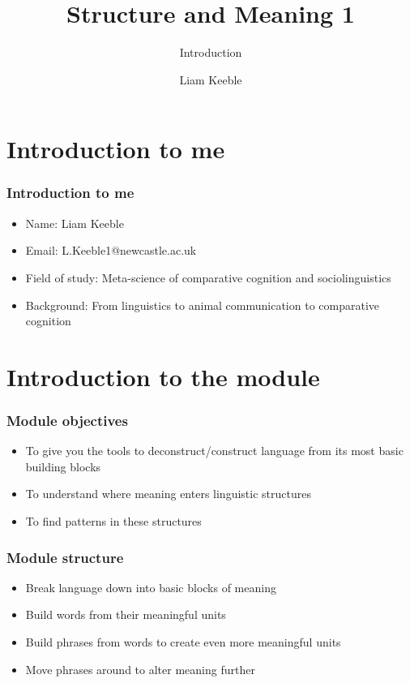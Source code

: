 \documentclass{beamer}
\title{Structure and Meaning 1}
\subtitle{Introduction}
\author{Liam Keeble}
\institute{School of English Literature, Language and Linguistics}
\date{}
\begin{document}
\section{Introduction to me}

\frame{\titlepage}



\begin{frame}
\frametitle{Introduction to me}

\begin{itemize}
\item Name: Liam Keeble
\item Email: L.Keeble1@newcastle.ac.uk
\item Field of study: Meta-science of comparative cognition and sociolinguistics
\item Background: From linguistics to animal communication to comparative cognition

\end{itemize}

\end{frame}


\section{Introduction to the module}

\begin{frame}
\frametitle{Module objectives}
\begin{itemize}
\item To give you the tools to deconstruct/construct language from its most basic building blocks
\item To understand where meaning enters linguistic structures
\item To find patterns in these structures

\end{itemize}

\end{frame}

\begin{frame}
\frametitle{Module structure}

\begin{itemize}
\item Break language down into basic blocks of meaning
\item Build words from their meaningful units
\item Build phrases from words to create even more meaningful units
\item Move phrases around to alter meaning further
\end{itemize}

\end{frame}
\end{document}
